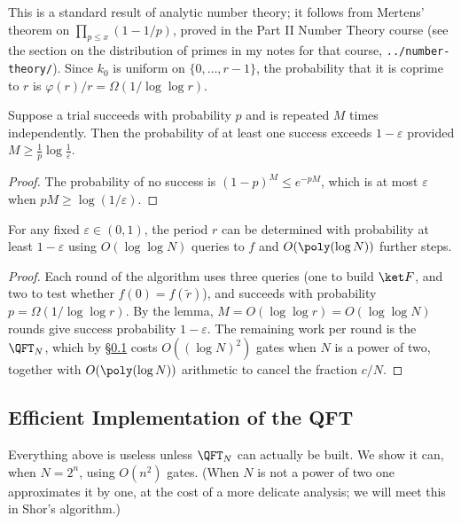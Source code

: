 This is a standard result of analytic number theory; it follows from Mertens' theorem on $\prod_{p\le x}(1-1/p)$, proved in the Part II Number Theory course (see the section on the distribution of primes in my notes for that course, \texttt{../number-theory/}). Since $k_0$ is uniform on $\{0,\dots,r-1\}$, the probability that it is coprime to $r$ is $\varphi(r)/r = \Omega(1/\log\log r)$.

\begin{lemma}
	Suppose a trial succeeds with probability $p$ and is repeated $M$ times independently. Then the probability of at least one success exceeds $1-\varepsilon$ provided $M\geq \frac{1}{p}\log\frac1\varepsilon$.
\end{lemma}

\begin{proof}
	The probability of no success is $(1-p)^M\leq e^{-pM}$, which is at most $\varepsilon$ when $pM\geq\log(1/\varepsilon)$.
\end{proof}

\begin{corollary}
	For any fixed $\varepsilon\in(0,1)$, the period $r$ can be determined with probability at least $1-\varepsilon$ using $O(\log\log N)$ queries to $f$ and $O(\poly(\log N))$ further steps.
\end{corollary}

\begin{proof}
	Each round of the algorithm uses three queries (one to build $\ket F$, and two to test whether $f(0) = f(\widetilde r)$), and succeeds with probability $p = \Omega(1/\log\log r)$. By the lemma, $M = O(\log\log r) = O(\log\log N)$ rounds give success probability $1-\varepsilon$. The remaining work per round is the $\QFT_N$, which by \S\ref{sec:qftimpl} costs $O((\log N)^2)$ gates when $N$ is a power of two, together with $O(\poly(\log N))$ arithmetic to cancel the fraction $c/N$.
\end{proof}

\subsection{Efficient Implementation of the QFT}\label{sec:qftimpl}

Everything above is useless unless $\QFT_N$ can actually be built. We show it can, when $N = 2^n$, using $O(n^2)$ gates. (When $N$ is not a power of two one approximates it by one, at the cost of a more delicate analysis; we will meet this in Shor's algorithm.)

